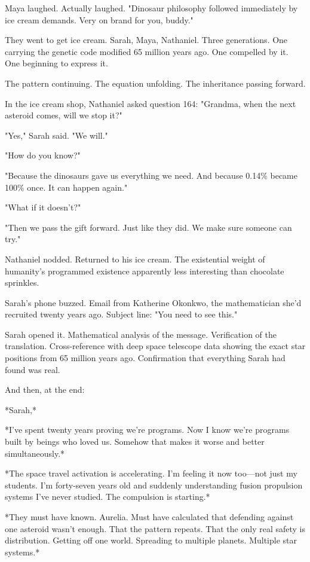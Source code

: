 Maya laughed. Actually laughed. "Dinosaur philosophy followed immediately by ice cream demands. Very on brand for you, buddy."

They went to get ice cream. Sarah, Maya, Nathaniel. Three generations. One carrying the genetic code modified 65 million years ago. One compelled by it. One beginning to express it.

The pattern continuing. The equation unfolding. The inheritance passing forward.

In the ice cream shop, Nathaniel asked question 164: "Grandma, when the next asteroid comes, will we stop it?"

"Yes," Sarah said. "We will."

"How do you know?"

"Because the dinosaurs gave us everything we need. And because 0.14\% became 100\% once. It can happen again."

"What if it doesn't?"

"Then we pass the gift forward. Just like they did. We make sure someone can try."

Nathaniel nodded. Returned to his ice cream. The existential weight of humanity's programmed existence apparently less interesting than chocolate sprinkles.

Sarah's phone buzzed. Email from Katherine Okonkwo, the mathematician she'd recruited twenty years ago. Subject line: "You need to see this."

Sarah opened it. Mathematical analysis of the message. Verification of the translation. Cross-reference with deep space telescope data showing the exact star positions from 65 million years ago. Confirmation that everything Sarah had found was real.

And then, at the end:

*Sarah,*

*I've spent twenty years proving we're programs. Now I know we're programs built by beings who loved us. Somehow that makes it worse and better simultaneously.*

*The space travel activation is accelerating. I'm feeling it now too—not just my students. I'm forty-seven years old and suddenly understanding fusion propulsion systems I've never studied. The compulsion is starting.*

*They must have known. Aurelia. Must have calculated that defending against one asteroid wasn't enough. That the pattern repeats. That the only real safety is distribution. Getting off one world. Spreading to multiple planets. Multiple star systems.*

